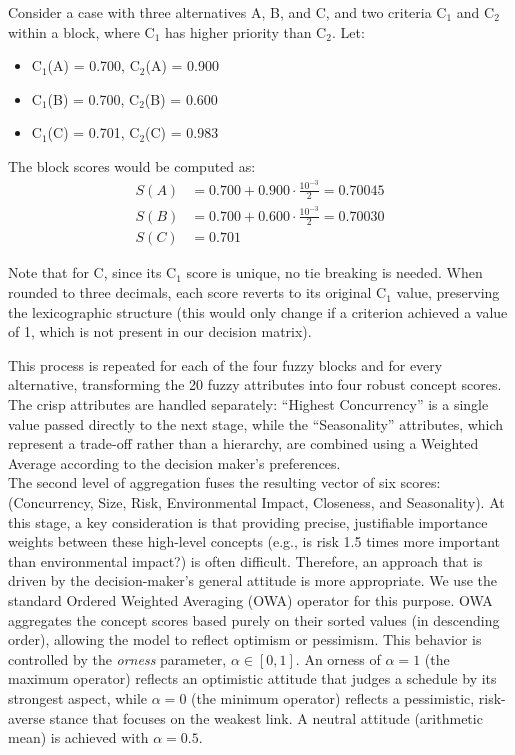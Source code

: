 \begin{example}
Consider a case with three alternatives A, B, and C, and two criteria C$_1$ and C$_2$ within a block, where C$_1$ has higher priority than C$_2$. Let:

\begin{itemize}
    \item C$_1$(A) = 0.700, C$_2$(A) = 0.900
    \item C$_1$(B) = 0.700, C$_2$(B) = 0.600
    \item C$_1$(C) = 0.701, C$_2$(C) = 0.983
\end{itemize}

The block scores would be computed as:
\begin{align*}
    S(A) &= 0.700 + 0.900 \cdot \frac{10^{-3}}{2} = 0.70045\\
    S(B) &= 0.700 + 0.600 \cdot \frac{10^{-3}}{2} = 0.70030\\
    S(C) &= 0.701
\end{align*}

Note that for C, since its C$_1$ score is unique, no tie breaking is needed. When rounded to three decimals, each score reverts to its original C$_1$ value, preserving the lexicographic structure (this would only change if a criterion achieved a value of 1, which is not present in our decision matrix).
\end{example}

This process is repeated for each of the four fuzzy blocks and for every alternative, transforming the 20 fuzzy attributes into four robust concept scores. The crisp attributes are handled separately: ``Highest Concurrency'' is a single value passed directly to the next stage, while the ``Seasonality'' attributes, which represent a trade-off rather than a hierarchy, are combined using a Weighted Average according to the decision maker's preferences.\\

The second level of aggregation fuses the resulting vector of six scores: (Concurrency, Size, Risk, Environmental Impact, Closeness, and Seasonality). At this stage, a key consideration is that providing precise, justifiable importance weights between these high-level concepts (e.g., is risk 1.5 times more important than environmental impact?) is often difficult. Therefore, an approach that is driven by the decision-maker's general attitude is more appropriate. We use the standard Ordered Weighted Averaging (OWA) operator for this purpose. OWA aggregates the concept scores based purely on their sorted values (in descending order), allowing the model to reflect optimism or pessimism. This behavior is controlled by the \textit{orness} parameter, $\alpha \in [0, 1]$. An orness of $\alpha=1$ (the maximum operator) reflects an optimistic attitude that judges a schedule by its strongest aspect, while $\alpha=0$ (the minimum operator) reflects a pessimistic, risk-averse stance that focuses on the weakest link. A neutral attitude (arithmetic mean) is achieved with $\alpha=0.5$.\\


